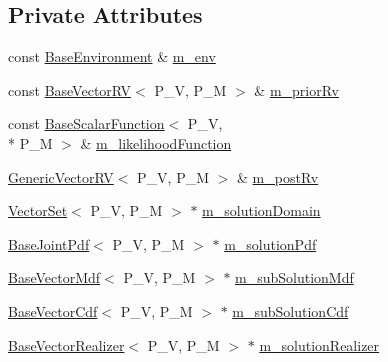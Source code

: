 \subsection*{Private Attributes}
\begin{DoxyCompactItemize}
\item 
const \hyperlink{class_q_u_e_s_o_1_1_base_environment}{Base\-Environment} \& \hyperlink{class_q_u_e_s_o_1_1_statistical_inverse_problem_ac24b3395274db9fad21b13abd2d070d1}{m\-\_\-env}
\item 
const \hyperlink{class_q_u_e_s_o_1_1_base_vector_r_v}{Base\-Vector\-R\-V}$<$ P\-\_\-\-V, P\-\_\-\-M $>$ \& \hyperlink{class_q_u_e_s_o_1_1_statistical_inverse_problem_aebe8ce8eb6fa5f264cafffbe35fbead0}{m\-\_\-prior\-Rv}
\item 
const \hyperlink{class_q_u_e_s_o_1_1_base_scalar_function}{Base\-Scalar\-Function}$<$ P\-\_\-\-V, \\*
P\-\_\-\-M $>$ \& \hyperlink{class_q_u_e_s_o_1_1_statistical_inverse_problem_a27177c077988c85c3310e0491f899332}{m\-\_\-likelihood\-Function}
\item 
\hyperlink{class_q_u_e_s_o_1_1_generic_vector_r_v}{Generic\-Vector\-R\-V}$<$ P\-\_\-\-V, P\-\_\-\-M $>$ \& \hyperlink{class_q_u_e_s_o_1_1_statistical_inverse_problem_a7dc62223cad355422449841ff3ec68e4}{m\-\_\-post\-Rv}
\item 
\hyperlink{class_q_u_e_s_o_1_1_vector_set}{Vector\-Set}$<$ P\-\_\-\-V, P\-\_\-\-M $>$ $\ast$ \hyperlink{class_q_u_e_s_o_1_1_statistical_inverse_problem_a51eeabd608af36b009d67b2a5244db9c}{m\-\_\-solution\-Domain}
\item 
\hyperlink{class_q_u_e_s_o_1_1_base_joint_pdf}{Base\-Joint\-Pdf}$<$ P\-\_\-\-V, P\-\_\-\-M $>$ $\ast$ \hyperlink{class_q_u_e_s_o_1_1_statistical_inverse_problem_a6ea67d31e6651f1dd4aa6983d4a01865}{m\-\_\-solution\-Pdf}
\item 
\hyperlink{class_q_u_e_s_o_1_1_base_vector_mdf}{Base\-Vector\-Mdf}$<$ P\-\_\-\-V, P\-\_\-\-M $>$ $\ast$ \hyperlink{class_q_u_e_s_o_1_1_statistical_inverse_problem_a4e4808280b09aa4ae0584521b78230ef}{m\-\_\-sub\-Solution\-Mdf}
\item 
\hyperlink{class_q_u_e_s_o_1_1_base_vector_cdf}{Base\-Vector\-Cdf}$<$ P\-\_\-\-V, P\-\_\-\-M $>$ $\ast$ \hyperlink{class_q_u_e_s_o_1_1_statistical_inverse_problem_a4cb3684669aa87b1d4a6903b55978969}{m\-\_\-sub\-Solution\-Cdf}
\item 
\hyperlink{class_q_u_e_s_o_1_1_base_vector_realizer}{Base\-Vector\-Realizer}$<$ P\-\_\-\-V, P\-\_\-\-M $>$ $\ast$ \hyperlink{class_q_u_e_s_o_1_1_statistical_inverse_problem_a4ac9fdff2472ae289fcf1413d210e38e}{m\-\_\-solution\-Realizer}

\end{DoxyCompactItemize}

